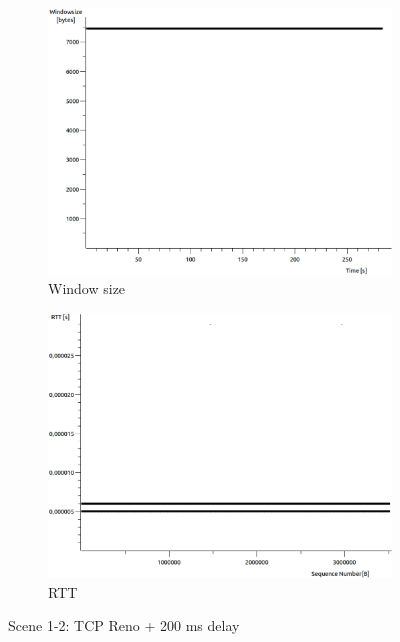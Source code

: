\documentclass[conference,a4paper]{../../sty/IEEEtran}
\begin{document}
\begin{figure}
\begin{subfigure}[b]{0.2\textwidth}
  \includegraphics[width=\textwidth]{s1-2_wnd}
  \caption{Window size}
 \end{subfigure}
 \begin{subfigure}[b]{0.2\textwidth}
  \includegraphics[width=\textwidth]{s1-2_rtt}
  \caption{RTT}
 \end{subfigure}
 \caption{Scene 1-2: TCP Reno + 200 ms delay}
\end{figure}
\end{document}

